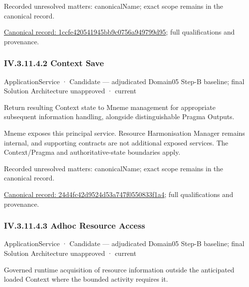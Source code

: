 {\small Recorded unresolved matters: canonicalName; exact scope remains in the canonical record.}\par
{\footnotesize \href{../../../../continuum/application/application-service/1ccfe420541945bb9c0756a949799d95.md}{Canonical record: 1ccfe420541945bb9c0756a949799d95}; full qualifications and provenance.}\par
\subsubsection*{IV.3.11.4.2 Context Save}
\label{navigation:IV.3.11.4.2}

\label{element:24d4fc42d9524d53a747f0550833f1a4}
{\small ApplicationService · Candidate — adjudicated Domain05 Step-B baseline; final Solution Architecture unapproved · current}\par

Return resulting Context state to Mneme management for appropriate subsequent information handling, alongside distinguishable Pragma Outputs.



Mneme exposes this principal service. Resource Harmonisation Manager remains internal, and supporting contracts are not additional exposed services. The Context/Pragma and authoritative-state boundaries apply.


{\small Recorded unresolved matters: canonicalName; exact scope remains in the canonical record.}\par
{\footnotesize \href{../../../../continuum/application/application-service/24d4fc42d9524d53a747f0550833f1a4.md}{Canonical record: 24d4fc42d9524d53a747f0550833f1a4}; full qualifications and provenance.}\par
\subsubsection*{IV.3.11.4.3 Adhoc Resource Access}
\label{navigation:IV.3.11.4.3}

\label{element:410f2f55bbda481b973c6c67b924f0be}
{\small ApplicationService · Candidate — adjudicated Domain05 Step-B baseline; final Solution Architecture unapproved · current}\par

Governed runtime acquisition of resource information outside the anticipated loaded Context where the bounded activity requires it.



